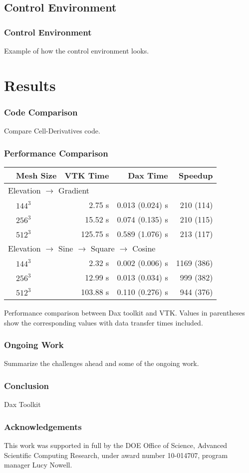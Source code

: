 \documentclass{beamer}
\begin{document}
\subsection{Control Environment}
\frame
{
  \frametitle{Control Environment}
  Example of how the control environment looks.
}

\section{Results}

\frame
{
  \frametitle{Code Comparison}
  Compare Cell-Derivatives code.
}

\frame
{
  \frametitle{Performance Comparison}
  \begin{table}[htbp]
    \centering
    \label{tab:Results}
    \begin{tabular}{llrrr}
      \qquad & Mesh Size & VTK Time & Dax Time & Speedup \\
      \hline
      \multicolumn{5}{l}{Elevation $\rightarrow$ Gradient} \\
      & $144^3$ & 2.75 s & 0.013 (0.024) s & 210 (114) \\
      & $256^3$ &  15.52 s & 0.074 (0.135) s & 210 (115) \\
      & $512^3$ &  125.75 s & 0.589 (1.076) s &  213 (117) \\
      \multicolumn{5}{l}{Elevation $\rightarrow$ Sine $\rightarrow$ Square $\rightarrow$ Cosine} \\
      & $144^3$ & 2.32 s & 0.002 (0.006) s &  1169 (386) \\
      & $256^3$ &  12.99 s & 0.013 (0.034) s & 999 (382) \\
      & $512^3$ & 103.88 s & 0.110 (0.276) s &  944 (376) \\
    \end{tabular} 
  \end{table}
  {Performance comparison between Dax toolkit and VTK. Values in
  parentheses show the corresponding values with data transfer times
  included}.
}

\frame
{
  \frametitle{Ongoing Work}
  Summarize the challenges ahead and some of the ongoing work.
}

\frame
{
  \frametitle{Conclusion}
  Dax Toolkit
}

\frame
{
  \frametitle{Acknowledgements}
  This work was supported in full by the DOE Office of Science, Advanced
  Scientific Computing Research, under award number 10-014707, program manager
  Lucy Nowell.
}
\end{document}
